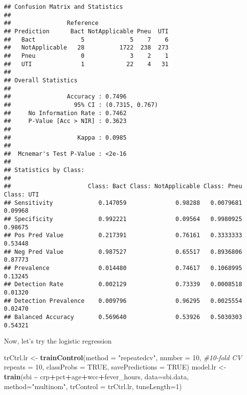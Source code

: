 \documentclass[
]{book}
\newenvironment{Shaded}{\begin{snugshade}}{\end{snugshade}}
\newcommand{\AttributeTok}[1]{\textcolor[rgb]{0.13,0.29,0.53}{#1}}
\newcommand{\CommentTok}[1]{\textcolor[rgb]{0.56,0.35,0.01}{\textit{#1}}}
\newcommand{\ConstantTok}[1]{\textcolor[rgb]{0.56,0.35,0.01}{#1}}
\newcommand{\DecValTok}[1]{\textcolor[rgb]{0.00,0.00,0.81}{#1}}
\newcommand{\FunctionTok}[1]{\textcolor[rgb]{0.13,0.29,0.53}{\textbf{#1}}}
\newcommand{\NormalTok}[1]{#1}
\newcommand{\OtherTok}[1]{\textcolor[rgb]{0.56,0.35,0.01}{#1}}
\newcommand{\SpecialCharTok}[1]{\textcolor[rgb]{0.81,0.36,0.00}{\textbf{#1}}}
\newcommand{\StringTok}[1]{\textcolor[rgb]{0.31,0.60,0.02}{#1}}
\begin{document}
\begin{verbatim}
## Confusion Matrix and Statistics
## 
##                Reference
## Prediction      Bact NotApplicable Pneu  UTI
##   Bact             5             5    7    6
##   NotApplicable   28          1722  238  273
##   Pneu             0             3    2    1
##   UTI              1            22    4   31
## 
## Overall Statistics
##                                          
##                Accuracy : 0.7496         
##                  95% CI : (0.7315, 0.767)
##     No Information Rate : 0.7462         
##     P-Value [Acc > NIR] : 0.3623         
##                                          
##                   Kappa : 0.0985         
##                                          
##  Mcnemar's Test P-Value : <2e-16         
## 
## Statistics by Class:
## 
##                      Class: Bact Class: NotApplicable Class: Pneu Class: UTI
## Sensitivity             0.147059              0.98288   0.0079681    0.09968
## Specificity             0.992221              0.09564   0.9980925    0.98675
## Pos Pred Value          0.217391              0.76161   0.3333333    0.53448
## Neg Pred Value          0.987527              0.65517   0.8936806    0.87773
## Prevalence              0.014480              0.74617   0.1068995    0.13245
## Detection Rate          0.002129              0.73339   0.0008518    0.01320
## Detection Prevalence    0.009796              0.96295   0.0025554    0.02470
## Balanced Accuracy       0.569640              0.53926   0.5030303    0.54321
\end{verbatim}

Now, let's try the logistic regression

\begin{Shaded}
\begin{Highlighting}[]
\NormalTok{trCtrl.lr }\OtherTok{\textless{}{-}} \FunctionTok{trainControl}\NormalTok{(}\AttributeTok{method =} \StringTok{"repeatedcv"}\NormalTok{,}
                           \AttributeTok{number =} \DecValTok{10}\NormalTok{,  }\CommentTok{\#10{-}fold CV}
                           \AttributeTok{repeats =} \DecValTok{10}\NormalTok{,}
                           \AttributeTok{classProbs =} \ConstantTok{TRUE}\NormalTok{,}
                           \AttributeTok{savePredictions =} \ConstantTok{TRUE}\NormalTok{)}
\NormalTok{model.lr }\OtherTok{\textless{}{-}} \FunctionTok{train}\NormalTok{(sbi }\SpecialCharTok{\textasciitilde{}}\NormalTok{ crp}\SpecialCharTok{+}\NormalTok{pct}\SpecialCharTok{+}\NormalTok{age}\SpecialCharTok{+}\NormalTok{wcc}\SpecialCharTok{+}\NormalTok{fever\_hours, }
                   \AttributeTok{data=}\NormalTok{sbi.data, }
                   \AttributeTok{method=}\StringTok{"multinom"}\NormalTok{,}
                   \AttributeTok{trControl =}\NormalTok{ trCtrl.lr,}
                   \AttributeTok{tuneLength=}\DecValTok{1}\NormalTok{)}
\end{Highlighting}
\end{Shaded}
\end{document}
